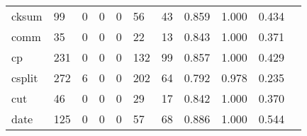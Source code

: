 \begin{longtable}{lp{1.2cm}p{1.2cm}p{1.2cm}p{1.2cm}p{1.2cm}p{1.2cm}p{1.2cm}p{1.2cm}p{1.2cm}p{1.2cm}}
cksum     &                                    99 &                                                  0 &                                                  0 &                                                  0 &                                                 56 &                                                 43 &                                         0.859 &                                              1.000 &                                              0.434 \\
comm      &                                    35 &                                                  0 &                                                  0 &                                                  0 &                                                 22 &                                                 13 &                                         0.843 &                                              1.000 &                                              0.371 \\
cp        &                                   231 &                                                  0 &                                                  0 &                                                  0 &                                                132 &                                                 99 &                                         0.857 &                                              1.000 &                                              0.429 \\
csplit    &                                   272 &                                                  6 &                                                  0 &                                                  0 &                                                202 &                                                 64 &                                         0.792 &                                              0.978 &                                              0.235 \\
cut       &                                    46 &                                                  0 &                                                  0 &                                                  0 &                                                 29 &                                                 17 &                                         0.842 &                                              1.000 &                                              0.370 \\
date      &                                   125 &                                                  0 &                                                  0 &                                                  0 &                                                 57 &                                                 68 &                                         0.886 &                                              1.000 &                                              0.544 \\

\end{longtable}

